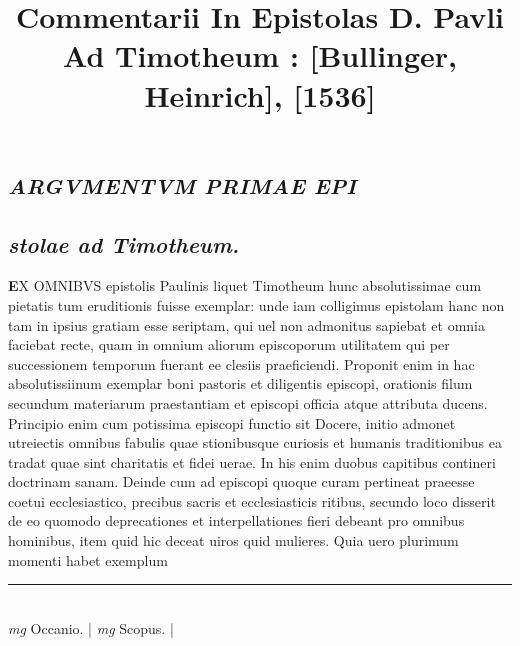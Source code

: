 \documentclass{article}
\begin{document}
\date{}
        \title{Commentarii In Epistolas D. Pavli Ad Timotheum : [Bullinger, Heinrich], [1536]}
\maketitle
\tableofcontents
\clearpage
\begin{pages} 
\beginnumbering
        
\marginpar{[ p.92 ]}
{}
\subsection*{\textit{ARGVMENTVM PRIMAE EPI}}
{}
\subsection*{\textit{stolae ad Timotheum. }}\pstart \huge\textbf{E}\normalsize X OMNIBVS epistolis Paulinis liquet Timotheum hunc absolutissimae cum pietatis tum eruditionis fuisse exemplar: unde iam colligimus epistolam hanc non tam in ipsius gratiam esse seriptam, qui uel non admonitus sapiebat et omnia faciebat recte, quam in omnium aliorum episcoporum utilitatem qui per successionem temporum fuerant ee clesiis praeficiendi. Proponit enim in hac absolutissiinum exemplar boni pastoris et diligentis episcopi, orationis filum secundum materiarum praestantiam et episcopi officia atque attributa ducens.  \pend\pstart Principio enim cum potissima episcopi functio sit Docere, initio admonet utreiectis omnibus fabulis quae stionibusque curiosis et humanis traditionibus ea tradat quae sint charitatis et fidei uerae. In his enim duobus capitibus contineri doctrinam sanam.  \pend\pstart Deinde cum ad episcopi quoque curam pertineat praeesse coetui ecclesiastico, precibus sacris et ecclesiasticis ritibus, secundo loco disserit de eo quomodo deprecationes et interpellationes fieri debeant pro omnibus hominibus, item quid hic deceat uiros quid mulieres.  \pend\pstart Quia uero plurimum momenti habet exemplum  \pend
\vspace{0.5cm}\noindent
\vspace{0.2cm}\rule{1cm}{0.2pt}\\ 
\hspace{0.2cm}\textit{mg}
\footnotesize Occanio. 
\normalsize| 
\hspace{0.2cm}\textit{mg}
\footnotesize Scopus. 
\normalsize| 

\end{pages}
\end{document}
